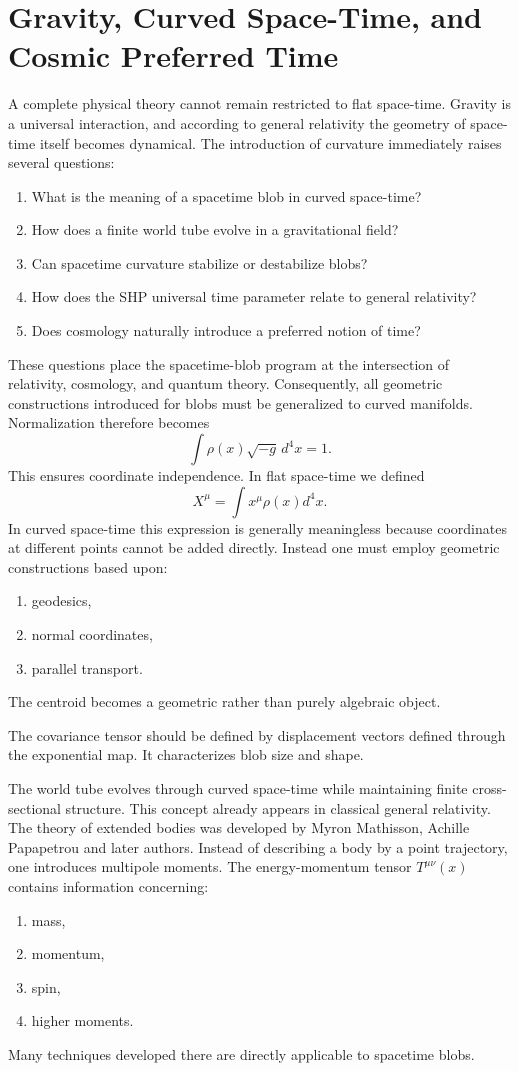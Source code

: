 \section{Gravity, Curved Space-Time, and Cosmic Preferred Time}
A complete physical theory cannot remain restricted to flat
space-time. Gravity is a universal interaction, and according to
general relativity the geometry of space-time itself becomes dynamical.
The introduction of curvature immediately raises several questions:
\begin{enumerate}
\item What is the meaning of a spacetime blob in curved space-time?
\item How does a finite world tube evolve in a gravitational field?
\item Can spacetime curvature stabilize or destabilize blobs?
\item How does the SHP universal time parameter relate to
general relativity?
\item Does cosmology naturally introduce a preferred notion of time?
\end{enumerate}
These questions place the spacetime-blob program at the intersection of
relativity, cosmology, and quantum theory.
Consequently, all geometric constructions introduced for blobs must be
generalized to curved manifolds.
Normalization therefore becomes
\[
\int \rho(x)\sqrt{-g}\,d^4x=1.
\]
This ensures coordinate independence.
In flat space-time we defined
\[
X^\mu=\int x^\mu \rho(x) d^4x.
\]
In curved space-time this expression is generally meaningless because
coordinates at different points cannot be added directly.
Instead one must employ geometric constructions based upon:
\begin{enumerate}
\item geodesics,
\item normal coordinates,
\item parallel transport.
\end{enumerate}
The centroid becomes a geometric rather than purely algebraic object.

The covariance tensor should be defined by
 displacement vectors defined through the exponential map.
It characterizes blob size and shape.

The world tube evolves through curved space-time while maintaining finite
cross-sectional structure.
This concept already appears in classical general relativity.
The theory of extended bodies was developed by
Myron Mathisson, Achille Papapetrou and later authors.
Instead of describing a body by a point trajectory,
one introduces multipole moments.
The energy-momentum tensor
$T^{\mu\nu}(x)$ 
contains information concerning:
\begin{enumerate}
\item mass,
\item momentum,
\item spin,
\item higher moments.
\end{enumerate}
Many techniques developed there are directly applicable to spacetime
blobs.

